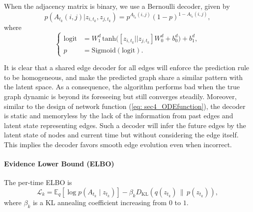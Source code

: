 When the adjacency matrix is binary, we use a Bernoulli decoder, given by 
\begin{equation*}
    p(A_{t_k}(i,j)|z_{i,t_k},z_{j,t_k}) = p^{A_{t_k}(i,j)}(1-p)^{1-A_{t_k}(i,j)},
\end{equation*}
where 
\begin{equation*}
    \left\{\begin{aligned}
        \mathrm{logit} &= W_1^d\, \mathrm{tanh}\!\big([z_{i,t_k}|| z_{j,t_k}]W_0^d + b_0^d\big)+b_1^d, \\
        p &= \mathrm{Sigmoid}(\mathrm{logit}).
    \end{aligned}\right.
\end{equation*}

It is clear that a shared edge decoder for all edges will enforce the prediction rule to be homogeneous,  
and make the predicted graph share a similar pattern with the latent space. 
As a consequence, the algorithm performs bad when the true graph dynamic is beyond its foreseeing but still converges steadily. 
Moreover, similar to the design of network function (\ref{eq: sec4_ODEfunction}), 
the decoder is static and memoryless by the lack of the information from past edges and latent state representing edges. 
Such a decoder will infer the future edges by the latent state of nodes and current time but without considering the edge itself. 
This implies the decoder favors smooth edge evolution even when incorrect. 

\paragraph{Evidence Lower Bound (ELBO)}

The per-time ELBO is
\begin{equation*}
    \mathcal{L}_k = \mathbb{E}_{q}[\log p(A_{t_k} \mid z_{t_k})] - \beta_k D_{\mathrm{KL}}(q(z_{t_k}) \,\|\, p(z_{t_k})),
\end{equation*}
where $\beta_k$ is a KL annealing coefficient increasing from $0$ to $1$.

